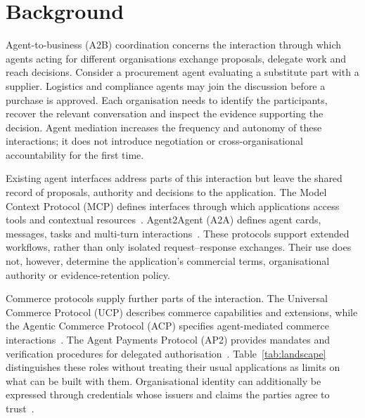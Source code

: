 \section{Background}
\label{sec:background}

Agent-to-business (A2B) coordination concerns the interaction through which agents acting for different organisations exchange proposals, delegate work and reach decisions. Consider a procurement agent evaluating a substitute part with a supplier. Logistics and compliance agents may join the discussion before a purchase is approved. Each organisation needs to identify the participants, recover the relevant conversation and inspect the evidence supporting the decision. Agent mediation increases the frequency and autonomy of these interactions; it does not introduce negotiation or cross-organisational accountability for the first time.


Existing agent interfaces address parts of this interaction but leave the shared record of proposals, authority and decisions to the application.
The Model Context Protocol (MCP) defines interfaces through which applications access tools and contextual resources~\citep{mcp2026spec}. Agent2Agent (A2A) defines agent cards, messages, tasks and multi-turn interactions~\citep{a2a2026spec}. These protocols support extended workflows, rather than only isolated request--response exchanges. Their use does not, however, determine the application's commercial terms, organisational authority or evidence-retention policy.

Commerce protocols supply further parts of the interaction. The Universal Commerce Protocol (UCP) describes commerce capabilities and extensions, while the Agentic Commerce Protocol (ACP) specifies agent-mediated commerce interactions~\citep{ucpspec,acpspec}. The Agent Payments Protocol (AP2) provides mandates and verification procedures for delegated authorisation~\citep{ap2auth,ap2impl}. Table~\ref{tab:landscape} distinguishes these roles without treating their usual applications as limits on what can be built with them. Organisational identity can additionally be expressed through credentials whose issuers and claims the parties agree to trust~\citep{w3c2025vc}.

